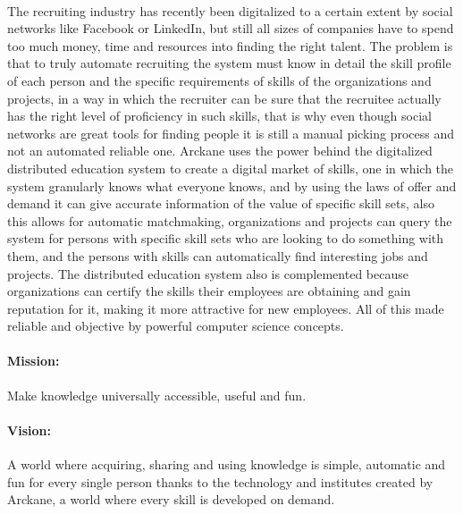 \paragraph{} The recruiting industry has recently been digitalized to a certain extent by social networks like Facebook or LinkedIn, but still all sizes of companies have to spend too much money, time and resources into finding the right talent. The problem is that to truly automate recruiting the system must know in detail the skill profile of each person and the specific requirements of skills of the organizations and projects, in a way in which the recruiter can be sure that the recruitee actually has the right level of proficiency in such skills, that is why even though social networks are great tools for finding people it is still a manual picking process and not an automated reliable one. Arckane uses the power behind the digitalized distributed education system to create a digital market of skills, one in which the system granularly knows what everyone knows, and by using the laws of offer and demand it can give accurate information of the value of specific skill sets, also this allows for automatic matchmaking, organizations and projects can query the system for persons with specific skill sets who are looking to do something with them, and the persons with skills can automatically find interesting jobs and projects. The distributed education system also is complemented because organizations can certify the skills their employees are obtaining and gain reputation for it, making it more attractive for new employees. All of this made reliable and objective by powerful computer science concepts.     

\paragraph{Mission:} Make knowledge universally accessible, useful and fun.

\paragraph{Vision:} A world where acquiring, sharing and using knowledge is simple, automatic and fun for every single person thanks to the technology and institutes created by Arckane, a world where every skill is developed on demand.


